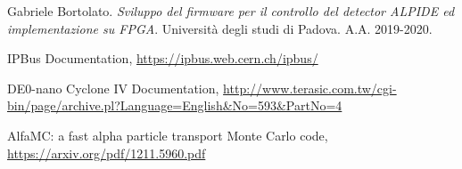 \begin{thebibliography}{99}
Gabriele Bortolato.
\textit{Sviluppo del firmware per il controllo del detector ALPIDE ed implementazione su FPGA}.
Università degli studi di Padova.
A.A. 2019-2020.

IPBus Documentation, \url{https://ipbus.web.cern.ch/ipbus/}

DE0-nano Cyclone IV Documentation, \url{http://www.terasic.com.tw/cgi-bin/page/archive.pl?Language=English&No=593&PartNo=4}

AlfaMC: a fast alpha particle transport Monte Carlo code, \url{https://arxiv.org/pdf/1211.5960.pdf}

\end{thebibliography}
